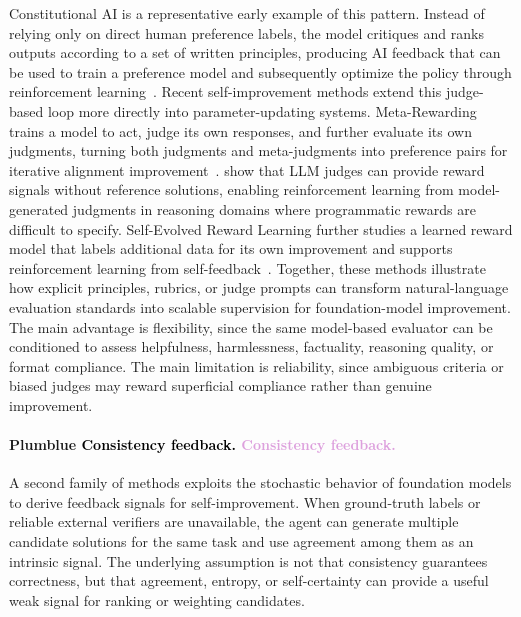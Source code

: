 \documentclass{article}
\let\oldtextcolor\textcolor
\renewcommand{\textcolor}[2]{
  \def\temp{#1}
  \def\red{blue}
  \ifx\temp\red
    \oldtextcolor{black}{#2}
  \else
    \oldtextcolor{#1}{#2}
  \fi
}
\begin{document}
Constitutional AI is a representative early example of this pattern. Instead of relying only on direct human preference labels, the model critiques and ranks outputs according to a set of written principles, producing AI feedback that can be used to train a preference model and subsequently optimize the policy through reinforcement learning~\citep{bai2022constitutional}. Recent self-improvement methods extend this judge-based loop more directly into parameter-updating systems. Meta-Rewarding trains a model to act, judge its own responses, and further evaluate its own judgments, turning both judgments and meta-judgments into preference pairs for iterative alignment improvement~\citep{wu-etal-2025-meta}. \cite{simonds2025self} show that LLM judges can provide reward signals without reference solutions, enabling reinforcement learning from model-generated judgments in reasoning domains where programmatic rewards are difficult to specify. Self-Evolved Reward Learning further studies a learned reward model that labels additional data for its own improvement and supports reinforcement learning from self-feedback~\citep{huang2025selfevolved}. Together, these methods illustrate how explicit principles, rubrics, or judge prompts can transform natural-language evaluation standards into scalable supervision for foundation-model improvement. The main advantage is flexibility, since the same model-based evaluator can be conditioned to assess helpfulness, harmlessness, factuality, reasoning quality, or format compliance. The main limitation is reliability, since ambiguous criteria or biased judges may reward superficial compliance rather than genuine improvement.

\paragraph{\textcolor{Plum}{Consistency feedback.}}

A second family of methods exploits the stochastic behavior of foundation models to derive feedback signals for self-improvement.
When ground-truth labels or reliable external verifiers are unavailable, the agent can generate multiple candidate solutions for the same task and use agreement among them as an intrinsic signal. The underlying assumption is not that consistency guarantees correctness, but that agreement, entropy, or self-certainty can provide a useful weak signal for ranking or weighting candidates.
\end{document}
